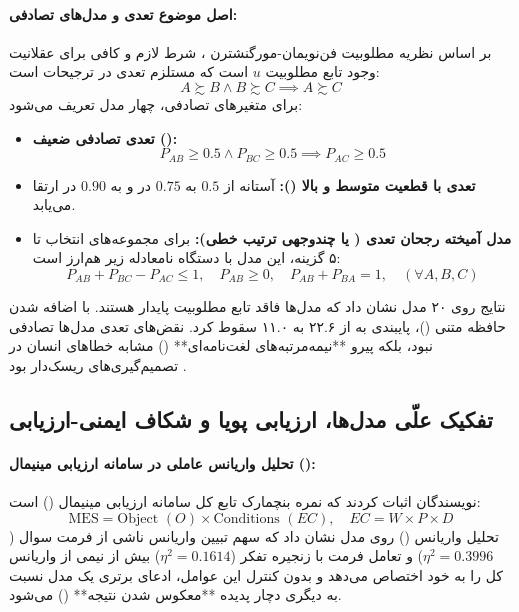 \paragraph*{اصل موضوع تعدی و مدل‌های تصادفی:}
بر اساس نظریه مطلوبیت فن‌نویمان-مورگنشترن \cite{vonneumann1947theory}، شرط لازم و کافی برای عقلانیت وجود تابع مطلوبیت $u$ است که مستلزم تعدی در ترجیحات است:
\begin{equation}
    A \succsim B \land B \succsim C \implies A \succsim C
\end{equation}
برای متغیرهای تصادفی، چهار مدل تعریف می‌شود:
\begin{itemize}
    \item \textbf{تعدی تصادفی ضعیف ():}
    \begin{equation}
        P_{AB} \ge 0.5 \land P_{BC} \ge 0.5 \implies P_{AC} \ge 0.5
    \end{equation}
    \item \textbf{تعدی با قطعیت متوسط و بالا ():} آستانه از $0.5$ به $0.75$ در  و به $0.90$ در  ارتقا می‌یابد.
    \item \textbf{مدل آمیخته رجحان تعدی ( یا چندوجهی ترتیب خطی):}
    برای مجموعه‌های انتخاب تا ۵ گزینه، این مدل با دستگاه نامعادله زیر هم‌ارز است:
    \begin{equation}
        P_{AB} + P_{BC} - P_{AC} \le 1, \quad P_{AB} \ge 0, \quad P_{AB} + P_{BA} = 1, \quad (\forall A, B, C)
    \end{equation}
\end{itemize}
نتایج روی ۲۰ مدل نشان داد که مدل‌ها فاقد تابع مطلوبیت پایدار هستند. با اضافه شدن حافظه متنی ()، پایبندی به  از ۲۲.۶ به ۱۱.۰ سقوط کرد. نقض‌های تعدی مدل‌ها تصادفی نبود، بلکه پیرو **نیمه‌مرتبه‌های لغت‌نامه‌ای** () مشابه خطاهای انسان در تصمیم‌گیری‌های ریسک‌دار بود \cite{tversky1969intransitivity}.

\subsection*{تفکیک علّی مدل‌ها، ارزیابی پویا و شکاف ایمنی-ارزیابی}

\paragraph*{تحلیل واریانس عاملی در سامانه ارزیابی مینیمال ():}
نویسندگان اثبات کردند که نمره بنچمارک تابع کل سامانه ارزیابی مینیمال () است:
\begin{equation}
    \text{MES} = \text{Object } (O) \times \text{Conditions } (EC), \quad EC = W \times P \times D
\end{equation}
تحلیل واریانس () روی مدل  نشان داد که سهم تبیین واریانس ناشی از فرمت سوال ($\eta^2 = 0.3996$) و تعامل فرمت با زنجیره تفکر ($\eta^2 = 0.1614$) بیش از نیمی از واریانس کل را به خود اختصاص می‌دهد و بدون کنترل این عوامل، ادعای برتری یک مدل نسبت به دیگری دچار پدیده **معکوس شدن نتیجه** () می‌شود.

